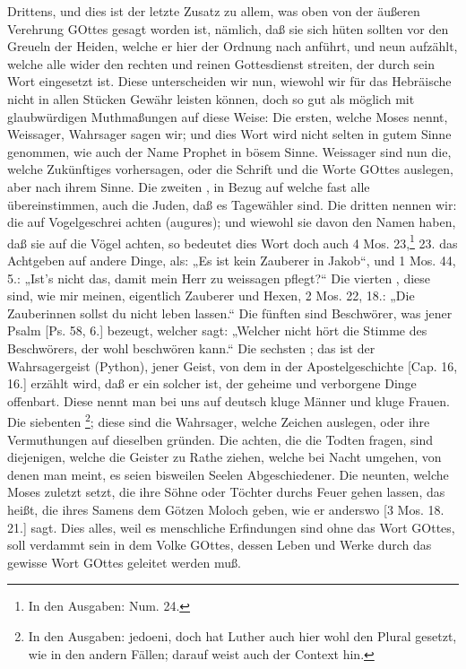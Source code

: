 Drittens, und dies ist der letzte Zusatz zu allem, was oben von der äußeren Verehrung GOttes gesagt worden ist, nämlich, daß sie sich hüten sollten vor den Greueln der Heiden, welche er hier der Ordnung nach anführt, und neun aufzählt, welche alle wider den rechten und reinen Gottesdienst streiten, der durch sein Wort eingesetzt ist. Diese unterscheiden wir nun, wiewohl wir für das Hebräische nicht in allen Stücken Gewähr leisten können, doch so gut als möglich mit glaubwürdigen Muthmaßungen auf diese Weise: Die ersten, welche Moses  nennt, Weissager, Wahrsager sagen wir; und dies Wort wird nicht selten in gutem Sinne genommen, wie auch der Name Prophet in bösem Sinne. Weissager sind nun die, welche Zukünftiges vorhersagen, oder die Schrift und die Worte GOttes auslegen, aber nach ihrem Sinne. Die zweiten , in Bezug auf welche fast alle übereinstimmen, auch die Juden, daß es Tagewähler sind. Die dritten  nennen wir: die auf Vogelgeschrei achten (augures); und wiewohl sie davon den Namen haben, daß sie auf die Vögel achten, so bedeutet dies Wort doch auch 4 Mos. 23,\footnote{In den Ausgaben: Num. 24.} 23. das Achtgeben auf andere Dinge, als: „Es ist kein Zauberer in Jakob“, und 1 Mos. 44, 5.: „Ist's nicht das, damit mein Herr zu weissagen pflegt?“ Die vierten , diese sind, wie mir meinen, eigentlich Zauberer und Hexen, 2 Mos. 22, 18.: „Die Zauberinnen sollst du nicht leben lassen.“ Die fünften  sind Beschwörer, was jener Psalm [Ps. 58, 6.] bezeugt, welcher sagt: „Welcher nicht hört die Stimme des Beschwörers, der wohl beschwören kann.“ Die sechsten ; das ist der Wahrsagergeist (Python), jener Geist, von dem in der Apostelgeschichte [Cap. 16, 16.] erzählt wird, daß er ein solcher ist, der geheime und verborgene Dinge offenbart. Diese nennt man bei uns auf deutsch kluge Männer und kluge Frauen. Die siebenten \footnote{In den Ausgaben: jedoeni, doch hat Luther auch hier wohl den Plural gesetzt, wie in den andern Fällen; darauf weist auch der Context hin.}; diese sind die Wahrsager, welche Zeichen auslegen, oder ihre Vermuthungen auf dieselben gründen. Die achten, die die Todten fragen, sind diejenigen, welche die Geister zu Rathe ziehen, welche bei Nacht umgehen, von denen man meint, es seien bisweilen Seelen Abgeschiedener. Die neunten, welche Moses zuletzt setzt, die ihre Söhne oder Töchter durchs Feuer gehen lassen, das heißt, die ihres Samens dem Götzen Moloch geben, wie er anderswo
[3 Mos. 18. 21.] sagt. Dies alles, weil es menschliche Erfindungen sind ohne das Wort GOttes, soll verdammt sein in dem Volke GOttes, dessen Leben und Werke durch das gewisse Wort GOttes geleitet werden muß.

